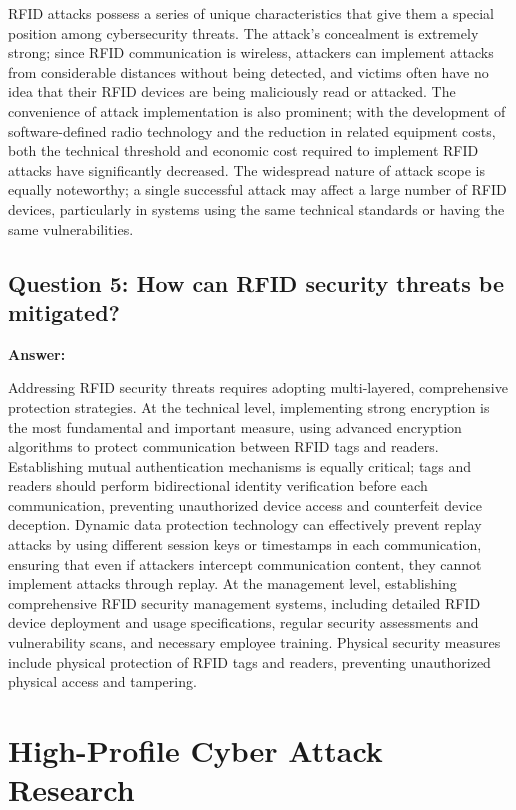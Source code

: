 \documentclass[12pt,a4paper]{article}
\begin{document}
RFID attacks possess a series of unique characteristics that give them a special position among cybersecurity threats. The attack's concealment is extremely strong; since RFID communication is wireless, attackers can implement attacks from considerable distances without being detected, and victims often have no idea that their RFID devices are being maliciously read or attacked. The convenience of attack implementation is also prominent; with the development of software-defined radio technology and the reduction in related equipment costs, both the technical threshold and economic cost required to implement RFID attacks have significantly decreased. The widespread nature of attack scope is equally noteworthy; a single successful attack may affect a large number of RFID devices, particularly in systems using the same technical standards or having the same vulnerabilities.

\subsection{Question 5: How can RFID security threats be mitigated?}

\textbf{Answer:}

Addressing RFID security threats requires adopting multi-layered, comprehensive protection strategies. At the technical level, implementing strong encryption is the most fundamental and important measure, using advanced encryption algorithms to protect communication between RFID tags and readers. Establishing mutual authentication mechanisms is equally critical; tags and readers should perform bidirectional identity verification before each communication, preventing unauthorized device access and counterfeit device deception. Dynamic data protection technology can effectively prevent replay attacks by using different session keys or timestamps in each communication, ensuring that even if attackers intercept communication content, they cannot implement attacks through replay. At the management level, establishing comprehensive RFID security management systems, including detailed RFID device deployment and usage specifications, regular security assessments and vulnerability scans, and necessary employee training. Physical security measures include physical protection of RFID tags and readers, preventing unauthorized physical access and tampering.

\section{High-Profile Cyber Attack Research}
\end{document}
